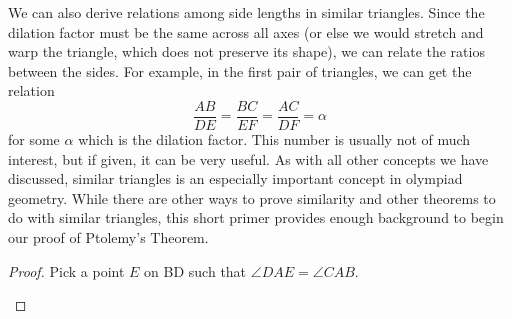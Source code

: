 We can also derive relations among side lengths in similar triangles. Since the dilation factor must be the same across all axes (or else we would stretch and warp the triangle, which does not preserve its shape), we can relate the ratios between the sides. For example, in the first pair of triangles, we can get the relation
\[
\frac{AB}{DE} = \frac{BC}{EF} =\frac{AC}{DF}=\alpha
\]
for some $\alpha$ which is the dilation factor. This number is usually not of much interest, but if given, it can be very useful. As with all other concepts we have discussed, similar triangles is an especially important concept in olympiad geometry. While there are other ways to prove similarity and other theorems to do with similar triangles, this short primer provides enough background to begin our proof of Ptolemy's Theorem. 
\begin{proof}
Pick a point $E$ on BD such that $\angle DAE = \angle CAB$. 
\begin{center}
\end{center}


\end{proof}
